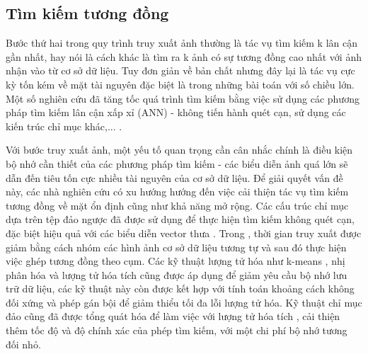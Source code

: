 \subsection{Tìm kiếm tương đồng}
Bước thứ hai trong quy trình truy xuất ảnh thường là tác vụ tìm kiếm k lân cận gần nhất, hay nói là cách khác là tìm ra k ảnh có sự tương đồng cao nhất với ảnh nhận vào từ cơ sở dữ liệu. Tuy đơn giản về bản chất nhưng đây lại là tác vụ cực kỳ tốn kém về mặt tài nguyên đặc biệt là trong những bài toán với số chiều lớn. Một số nghiên cứu đã tăng tốc quá trình tìm kiếm bằng việc sử dụng các phương pháp tìm kiếm lân cận xấp xỉ (ANN) - không tiến hành quét cạn, sử dụng các kiến trúc chỉ mục khác,... \cite{4270175, Xie2015ImageCA, Mikolajczyk2007ImprovingDF, Muja2009FastAN, Muja2012FastMO, wang2017survey, magliani2019efficient, johnson2017billionscale}.

Với bước truy xuất ảnh, một yếu tố quan trọng cần cân nhắc chính là điều kiện bộ nhớ cần thiết của các phương pháp tìm kiếm - các biểu diễn ảnh quá lớn sẽ dẫn đến tiêu tốn cực nhiều tài nguyên của cơ sở dữ liệu. Để giải quyết vấn đề này, các nhà nghiên cứu có xu hướng hướng đến việc cải thiện tác vụ tìm kiếm tương đồng về mặt ổn định cũng như khả năng mở rộng. Các cấu trúc chỉ mục dựa trên tệp đảo ngược \cite{Salton1988TermWeightingAI} đã được sử dụng để thực hiện tìm kiếm không quét cạn, đặc biệt hiệu quả với các biểu diễn vector thưa \cite{Johns2011FromIT, Sivic2003VideoGA, imageSearchKernel, Mohedano2016sOL, noh2018largescale, Philbin2007ObjectRW}. Trong \cite{Johns2011FromIT}, thời gian truy xuất được giảm bằng cách nhóm các hình ảnh cơ sở dữ liệu tương tự và sau đó thực hiện việc ghép tương đồng theo cụm. Các kỹ thuật lượng tử hóa như k-means \cite{Philbin2007ObjectRW, Torii2013VisualPR}, nhị phân hóa \cite{Perronnin2010LargescaleIR} và lượng tử hóa tích \cite{imageSearchKernel} cũng được áp dụng để giảm yêu cầu bộ nhớ lưu trữ dữ liệu, các kỹ thuật này còn được kết hợp với tính toán khoảng cách không đối xứng \cite{5432202} và phép gán bội \cite{imageSearchKernel, Jgou2008HammingEA, 5432202, Philbin2007ObjectRW, Tolias2014VisualQE, Li2015PairwiseGM} để giảm thiểu tối đa lỗi lượng tử hóa. Kỹ thuật chỉ mục đảo cũng đã được tổng quát hóa để làm việc với lượng tử hóa tích \cite{Guo2016DeepLF, 5432202, Babenko2012TheIM}, cải thiện thêm tốc độ và độ chính xác của phép tìm kiếm, với một chi phí bộ nhớ tương đối nhỏ.